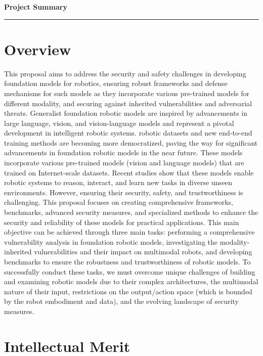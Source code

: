 {\Large\bfseries\filcenter
Project Summary
\\\rule{\textwidth}{0.4pt}}



\section*{Overview}

This proposal aims to address the security and safety challenges in developing foundation models for robotics, ensuring robust frameworks and defense mechanisms for such models as they incorporate various pre-trained models for different modality, and securing against inherited vulnerabilities and adversarial threats.
Generalist foundation robotic models are inspired by advancements in large language, vision, and vision-language models and represent a pivotal development in intelligent robotic systems. 
\xot robotic datasets and new end-to-end training methods are becoming more democratized, paving the way for significant advancements in foundation robotic models in the near future.
These models incorporate various pre-trained models (\eg vision and language models) that are trained on Internet-scale datasets.
Recent studies show that these models enable robotic systems to reason, interact, and learn new tasks in diverse unseen environments.
However, ensuring their security, safety, and trustworthiness is challenging. This proposal focuses on creating comprehensive frameworks, benchmarks, advanced security measures, and specialized methods to enhance the security and reliability of these models for practical applications.
This main objective can be achieved through three main tasks:  performing a comprehensive vulnerability analysis in foundation robotic models,  investigating the modality-inherited vulnerabilities and their impact on multimodal robots, and  developing benchmarks to ensure the robustness and trustworthiness of robotic models.
To successfully conduct these tasks, we must overcome unique challenges of building and examining robotic models due to their complex architectures, the multimodal nature of their input, restrictions on the output/action space (which is bounded by the robot embodiment and data), and the evolving landscape of security measures.



\section*{Intellectual Merit}


